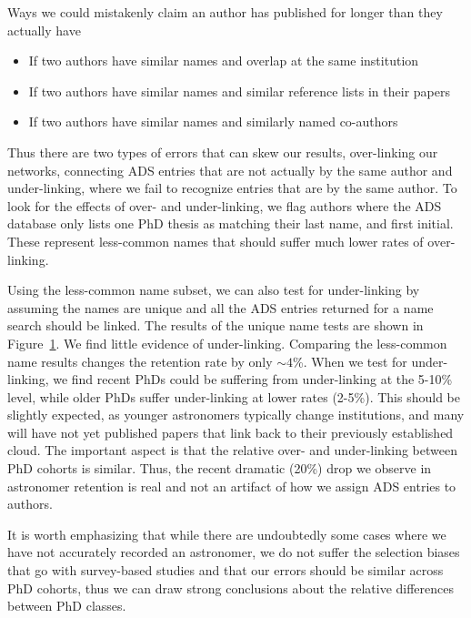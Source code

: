 \documentclass{emulateapj}
\begin{document}
Ways we could mistakenly claim an author has published for longer than they actually have
\begin{itemize}
\item{If two authors have similar names and overlap at the same institution}
\item{If two authors have similar names and similar reference lists in their papers}
  \item{If two authors have similar names and similarly named co-authors}
\end{itemize}

Thus there are two types of errors that can skew our results, over-linking our networks, connecting ADS entries that are not actually by the same author and under-linking, where we fail to recognize entries that are by the same author.  To look for the effects of over- and under-linking, we flag authors where the ADS database only lists one PhD thesis as matching their last name, and first initial. These represent less-common names that should suffer much lower rates of over-linking.

Using the less-common name subset, we can also test for under-linking by assuming the names are unique and all the ADS entries returned for a name search should be linked.  The results of the unique name tests are shown in Figure~\ref{fig:unames}. We find little evidence of under-linking. Comparing the less-common name results changes the retention rate by only $\sim4$\%. When we test for under-linking, we find recent PhDs could be suffering from under-linking at the 5-10\% level, while older PhDs suffer under-linking at lower rates (2-5\%).  This should be slightly expected, as younger astronomers typically change institutions, and many will have not yet published papers that link back to their previously established cloud.  The important aspect is that the relative over- and under-linking between PhD cohorts is similar.  Thus, the recent dramatic (20\%) drop we observe in astronomer retention is real and not an artifact of how we assign ADS entries to authors.

\begin{figure}
  \caption{\label{fig:unames}}
  \end{figure}


It is worth emphasizing that while there are undoubtedly some cases where we have not accurately recorded an astronomer, we do not suffer the selection biases that go with survey-based studies and that our errors should be similar across PhD cohorts, thus we can draw strong conclusions about the relative differences between PhD classes.
\end{document}
